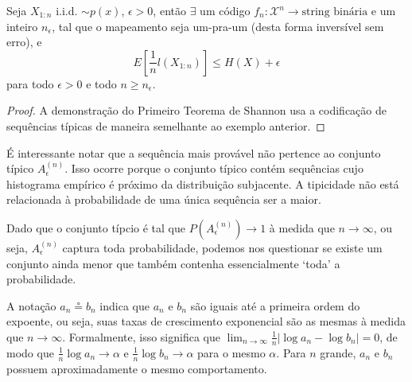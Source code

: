 \begin{theorem}
Seja $X_{1:n}$ i.i.d. $\sim p(x)$, $\epsilon > 0$, então $\exists$ um código $f_n : \mathcal{X}^n \rightarrow \text{string binária}$
e um inteiro $n_{\epsilon}$, tal que o mapeamento seja um-pra-um (desta forma inversível sem erro), e
      \begin{equation}
      E[ \frac{1}{n} l(X_{1:n})] \leq H(X) + \epsilon
      \end{equation}
para todo $\epsilon > 0$ e todo $n \geq n_{\epsilon}$.
\end{theorem}

\begin{proof}
  A demonstração do Primeiro Teorema de Shannon usa a codificação de sequências típicas de maneira semelhante ao
  exemplo anterior.
\end{proof}


É interessante notar que a sequência mais provável não pertence ao conjunto
típico $A_\epsilon^{(n)}$. Isso ocorre porque o conjunto típico contém
sequências cujo histograma empírico é próximo da distribuição subjacente. A
tipicidade não está relacionada à probabilidade de uma única sequência ser a
maior. 

Dado que o conjunto típcio é tal que $P(A_\epsilon^{(n)}) \to 1$ à medida que
$n \to \infty$, ou seja, $A_\epsilon^{(n)}$ captura toda probabilidade, podemos
nos questionar se existe um conjunto ainda menor que também contenha
essencialmente `toda' a probabilidade.

\begin{definition}\label{def:saiapoe}
A notação $a_n \circeq b_n$ indica que $a_n$ e $b_n$ são iguais até a primeira ordem do expoente,
ou seja, suas taxas de crescimento exponencial são as mesmas à medida que $n \to \infty$. 
Formalmente, isso significa que $\lim_{n \to \infty} \frac{1}{n} |\log a_n - \log b_n| = 0$, 
de modo que $\frac{1}{n} \log a_n \to \alpha$ e $\frac{1}{n} \log b_n \to \alpha$ 
para o mesmo $\alpha$. Para $n$ grande, $a_n$ e $b_n$ possuem aproximadamente o mesmo comportamento. 
\end{definition}

